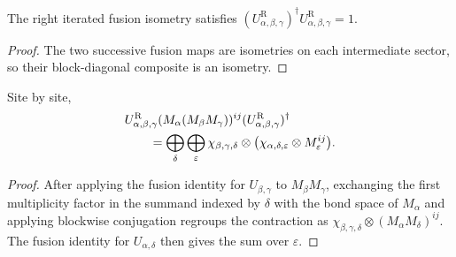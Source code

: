 \begin{lemma}%
    \label{thm:mpdo_right_fusion_isometry_isometry}
    \leanok
    The right iterated fusion isometry satisfies
    $(U^{\mathrm R}_{\alpha,\beta,\gamma})^\dagger
        U^{\mathrm R}_{\alpha,\beta,\gamma}=1$.
\end{lemma}
\begin{proof}\leanok
    The two successive fusion maps are isometries on each intermediate
    sector, so their block-diagonal composite is an isometry.
\end{proof}

\begin{lemma}%
    \label{thm:mpdo_right_fusion_apply}
    \leanok
    Site by site,
    \begin{align}
         & U^{\mathrm R}_{\alpha,\beta,\gamma}
        (M_\alpha(M_\beta M_\gamma))^{ij}
        (U^{\mathrm R}_{\alpha,\beta,\gamma})^\dagger
        \notag                                 \\
         & \qquad
        =\bigoplus_{\delta}\bigoplus_{\varepsilon}
        \chi_{\beta,\gamma,\delta}
        \otimes\bigl(\chi_{\alpha,\delta,\varepsilon}
        \otimes M_\varepsilon^{ij}\bigr).
        \notag
    \end{align}
\end{lemma}
\begin{proof}\leanok
    After applying the fusion identity for $U_{\beta,\gamma}$ to
    $M_\beta M_\gamma$, exchanging the first multiplicity factor in the
    summand indexed by $\delta$ with the bond space of $M_\alpha$ and applying
    blockwise conjugation regroups the contraction as
    $\chi_{\beta,\gamma,\delta}\otimes
        (M_\alpha M_\delta)^{ij}$.
    The fusion identity for $U_{\alpha,\delta}$ then gives the sum over
    $\varepsilon$.
\end{proof}

